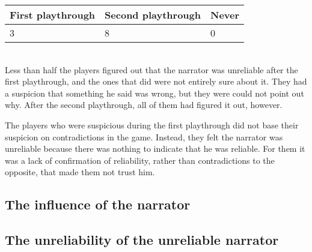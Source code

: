 \begin{tabular}{ | p{2.3cm} | p{2.3cm} | p{2.3cm} | }
  \hline                       
  \textbf{First playthrough} & \textbf{Second playthrough} & \textbf{Never} \\
  \hline  
  3 & 8 & 0 \\
  \hline  
\end{tabular} \\

Less than half the players figured out that the narrator was unreliable after the first playthrough, and the ones that did were not entirely sure about it. They had a suspicion that something he said was wrong, but they were could not point out why. After the second playthrough, all of them had figured it out, however.

The players who were suspicious during the first playthrough did not base their suspicion on contradictions in the game. Instead, they felt the narrator was unreliable because there was nothing to indicate that he was reliable. For them it was a lack of confirmation of reliability, rather than contradictions to the opposite, that made them not trust him.


\subsection{The influence of the narrator}


\subsection{The unreliability of the unreliable narrator}

